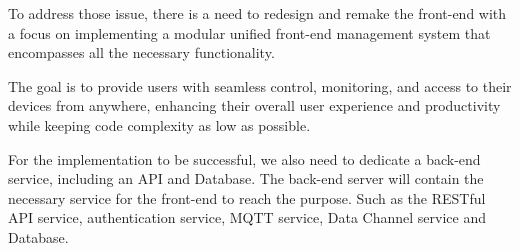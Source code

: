 To address those issue, there is a need to redesign and remake the front-end with
a focus on implementing a modular unified front-end management system that
encompasses all the necessary functionality. 

The goal is to provide users with seamless control, monitoring, and access to their devices from anywhere, 
enhancing their overall user experience and productivity while keeping code complexity as low as possible.

For the implementation to be successful, we also need to dedicate a back-end
service, including an API and Database. The back-end server will contain the
necessary service for the front-end to reach the purpose. Such as the RESTful
API service, authentication service, MQTT service, Data  Channel service and Database.

